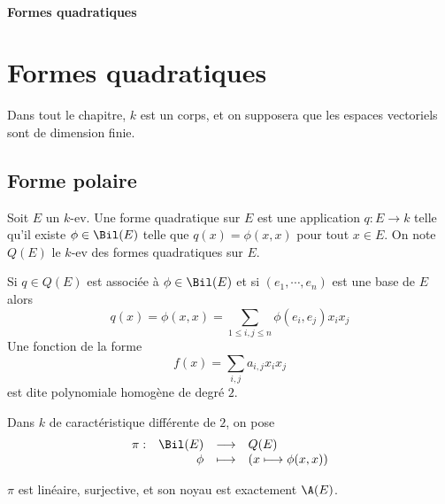 \ifsolo
    ~

    \vspace{1cm}

    \begin{center}
        \textbf{\LARGE Formes quadratiques} \\[1em]
    \end{center}
    \tableofcontents
\else
    \chapter{Formes quadratiques}

    \minitoc
\fi
\thispagestyle{empty}

Dans tout le chapitre, $k$ est un corps, et on supposera que les espaces vectoriels sont de dimension finie.

\section{Forme polaire}


\begin{dfn}
    Soit $E$ un  $k$-ev. Une forme quadratique sur  $E$ est une application  $q:E \longrightarrow k$ telle qu'il existe $\phi \in  \Bil(E)$ telle que $q(x)=\phi(x, x)$ pour tout  $x \in  E$. On note $Q(E)$ le  $k$-ev des formes quadratiques sur  $E$.
\end{dfn}

\begin{rem}
    Si $q \in  Q(E)$ est associée à $\phi\in \Bil(E)$ et si $(e_1, \cdots , e_n)$ est une base de $E$ alors \[q(x)=\phi(x, x)=\sum_{1\leq i,j\leq n}\phi(e_i,e_j)x_ix_j\]
    Une fonction de la forme \[f(x)=\sum_{i,j}a_{i,j}x_ix_j\] est dite polynomiale homogène de degré $2$.
\end{rem}


\begin{dfn}
Dans $k$ de caractéristique différente de $2$, on pose \[
\begin{array}{rrcl}
    \pi:& \Bil(E) & \longrightarrow & Q(E) \\
        & \phi & \longmapsto & \displaystyle (x \longmapsto \phi(x,x))
\end{array}
\] 
\end{dfn}

\begin{prop}
    $\pi$ est linéaire, surjective, et son noyau est exactement $\A(E)$.
\end{prop}


